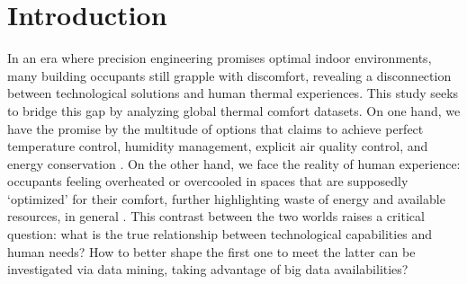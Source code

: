 \documentclass[final,3p,times,12pt]{elsarticle}
\begin{document}


\section{Introduction}
\label{sec1}

In an era where precision engineering promises optimal indoor environments, many building 
occupants still grapple with discomfort, revealing a disconnection between technological solutions and human thermal experiences. This study seeks to bridge this gap by analyzing global thermal comfort datasets. On one hand, we have the promise by the multitude of options that claims to achieve perfect temperature control, humidity management, explicit air quality control, and energy conservation \cite{almindeelEnergyThermalComfort2024,halhoulmerabetIntelligentBuildingControl2021,yangThermalComfortBuilding2014}. On the other hand, we face the reality of human experience: occupants feeling overheated or overcooled in spaces that are supposedly ‘optimized’ for their comfort, further highlighting waste of energy and available resources, in general \cite{djamilaIndoorThermalComfort2017,taleghaniReviewThermalComfort2013,zhouOpportunitiesChallengesUsing2023}. This contrast between the two worlds raises a critical question: what is the true relationship between technological capabilities and human needs? How to better shape the first one to meet the latter can be investigated via data mining, taking advantage of big data availabilities?
\end{document}
